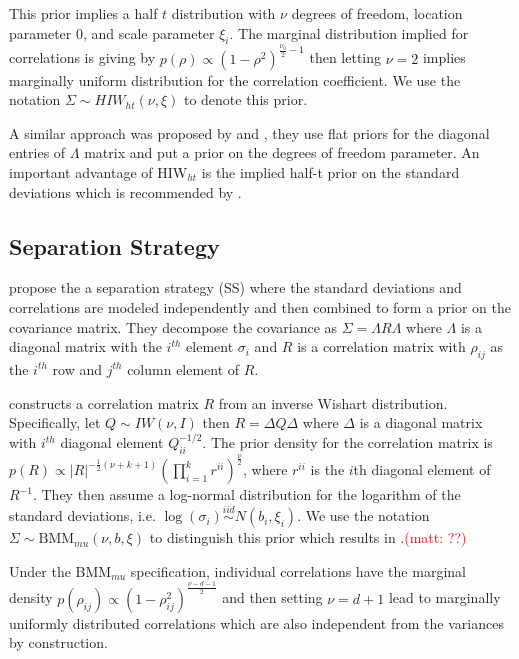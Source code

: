 \documentclass[12pt]{article}
\newcommand{\matt}[1]{\textcolor{red}{(matt: #1)}}
\begin{document}
This prior implies a half $t$ distribution with $\nu$ degrees of freedom, location parameter 0, and scale parameter $\xi_i$.  The marginal distribution implied for correlations is giving by $p(\rho) \propto (1-\rho^2)^{\frac{\nu_0}{2}-1}$ then letting $\nu=2$ implies marginally uniform distribution for the correlation coefficient. We use the notation $\Sigma \sim HIW_{ht}(\nu, \xi)$ to denote this prior.

A similar approach was proposed by \cite{daniels1999} and \cite{matilde}, they use flat priors for the diagonal entries of $\Lambda$ matrix and put a prior on the degrees of freedom parameter.  An important advantage of  HIW$_{ht}$ is the implied half-t prior on the standard deviations which is recommended by \cite{gelman2006prior}.

\subsection{Separation Strategy \label{sec:ss} }

\cite{barnard2000} propose the a separation strategy (SS) where the standard deviations and correlations are modeled independently and then combined to form a prior on the covariance matrix. They decompose the covariance as $\Sigma = \Lambda R \Lambda$  where $\Lambda$ is a diagonal matrix with the $i^{th}$ element $\sigma_{i}$ and $R$ is a correlation matrix with $\rho_{ij}$ as the $i^{th}$ row and $j^{th}$ column element of $R$. 

\cite{barnard2000} constructs a correlation matrix $R$ from an inverse Wishart distribution. Specifically, let $Q\sim IW(\nu, I )$ then $R = \Delta Q \Delta$ where $\Delta$ is a diagonal matrix with $i^{th}$ diagonal element $Q_{ii}^{-1/2}$. The prior density for the correlation matrix is $p(R) \propto |R|^{-\frac{1}{2}(\nu+k+1) }  (\prod_{i=1}^k r^{ii}) ^{\frac{\nu}{2}}$, where $r^{ii}$ is the $i$th diagonal element of $R^{-1}$. They then assume a log-normal distribution for the logarithm of the standard deviations, i.e. $\log(\sigma_i) \stackrel{iid} \sim N(b_i, \xi_i)$.  We use the notation $\Sigma \sim \mbox{BMM}_{mu}(\nu,b,\xi)$ to distinguish this prior which results in .\matt{??} 

Under the BMM$_{mu}$ specification, individual correlations have the marginal density $p(\rho_{ij}) \propto (1-\rho_{ij}^2)^{\frac{\nu-d-1}{2}}$ and then setting $\nu=d+1$ lead to marginally uniformly distributed correlations which are also independent from the variances by construction. 
\end{document}
